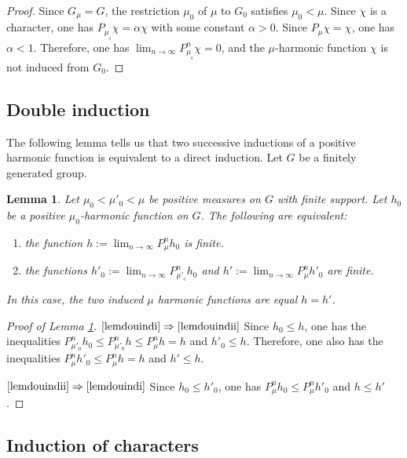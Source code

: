 \documentclass[JEP,XML,SOM,Unicode]{cedram}
\newenvironment{enumeratei}
{\bgroup\def\theenumi{\roman{enumi}}\def\theenumii{\arabic{enumii}}\begin{enumerate}}
{\end{enumerate}\egroup}
\newtheorem{Lem}[Thm]{Lemma}
\theoremstyle{definition}
\let\al\alpha
\let\bq\relax
\let\eq\relax
\let\ra\to
\begin{document}
\begin{proof}
Since $G_\mu=G$, the restriction $\mu_0$ of $\mu$ to $G_0$ satisfies $\mu_0<\mu$. Since $\chi$ is a character, one has $P_{\mu_{_0}}\chi =\al \chi$ with some constant $\al>0$.
Since $P_\mu\chi=\chi$, one has $\al<1$.
Therefore, one has $\lim_{n\ra\infty}P^n_{\mu_{_0}}\chi=0$, and
the $\mu$-harmonic function $\chi$ is not induced
from $G_0$.
\end{proof}

\subsection{Double induction}
\label{secdouind}

\bq
The following lemma
tells us that two successive inductions
of a positive harmonic function is equivalent to a direct induction.
\eq
Let $G$ be a finitely generated group.

\begin{Lem}
\label{lemdouind}
Let
$\mu_0<\mu'_0<\mu$ be positive measures on $G$ with finite support.
Let $h_0$ be a positive $\mu_0$-harmonic function on $G$.
The following are equivalent:
\begin{enumeratei}
\item\label{lemdouindi}
the function
$h:=\lim_{n\ra\infty}P^n_{\mu}h_0$ is finite.
\item\label{lemdouindii}
the functions
$h'_0:=\lim_{n\ra\infty}P^n_{\mu'_{_0}}h_0$ and
$h':=\lim_{n\ra\infty}P^n_{\mu}h'_0$ are finite.
\end{enumeratei}
\noindent
In this case, the two induced $\mu$ harmonic functions are equal $h=h'$.
\end{Lem}

\skpt
\begin{proof}[Proof of Lemma \ref{lemdouind}]
$\eqref{lemdouindi}\Rightarrow\eqref{lemdouindii}$
Since $h_0\leq h$, one has the inequalities
$P^n_{\mu'_0}h_0\leq P^n_{\mu'_0}h\leq P^n_{\mu}h= h$ and $h'_0\leq h$.
Therefore, one also has the inequalities $P^n_{\mu}h'_0\leq P^n_{\mu}h= h$ and $h'\leq h$.

$\eqref{lemdouindii} \Rightarrow\eqref{lemdouindi}$
Since $h_0\leq h'_0$, one has $P^n_{\mu}h_0\leq P^n_{\mu}h'_0$ and $h\leq h'$.
\end{proof}

\subsection{Induction of characters}
\label{secindcha}
\end{document}
